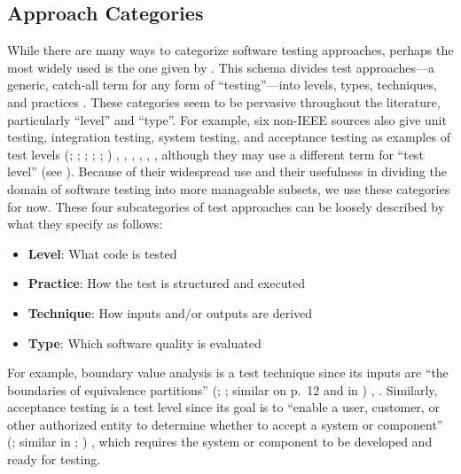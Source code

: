 \subsection{Approach Categories}
\label{categories-observ}

While there are many ways to categorize software testing approaches, perhaps
the most widely used is the one given by \ifnotpaper\else \citeauthor{IEEE2022}
\fi \citet{IEEE2022}. This schema divides test approaches---a generic, catch-all
term for any form of ``testing''---into levels, types, techniques, and practices
\citeyearpar[Fig.~2; see ]{IEEE2022}. These categories seem
to be pervasive throughout the literature, particularly ``level'' and ``type''.
\label{nonIEEE-sources}%
For example, six non-IEEE sources also give unit testing, integration testing,
system testing, and acceptance testing as examples of test levels \ifnotpaper
    (\citealp[pp.~5\=/6 to 5\=/7]{SWEBOK2024}; \citealpISTQB{};
    \citealp[pp.~807\==808]{Perry2006}; \citealp[pp.~443\==445]{PetersAndPedrycz2000};
    \citealp[p.~218]{KuļešovsEtAl2013};
    \citealp[pp.~9, 13]{Gerrard2000a})\else
    \cite[pp.~443\==445]{PetersAndPedrycz2000},
    \cite[pp.~5\=/6 to 5\=/7]{SWEBOK2024}, \cite{ISTQB},
    \cite[pp.~807\==808]{Perry2006}, \cite[pp.~9, 13]{Gerrard2000a},
    \cite[p.~218]{KuļešovsEtAl2013}\fi,
although they may use a different term for ``test
level'' (see ). Because of their widespread use and
their usefulness in dividing the domain of software testing into more
manageable subsets, we use these categories for now. These four subcategories
of test approaches can be loosely described by what they specify as
follows:
\begin{itemize}
    \item \textbf{Level}: What code is tested
    \item \textbf{Practice}: How the test is structured and executed
    \item \textbf{Technique}: How inputs and/or outputs are derived
    \item \textbf{Type}: Which software quality is evaluated
\end{itemize}
For example, boundary value analysis is a test technique since its inputs are
``the boundaries of equivalence partitions'' \ifnotpaper
    (\citealp[p.~2]{IEEE2022}; \citeyear[p.~1]{IEEE2021}; similar on p.~12 and
    in \citealpISTQB{})%
\else
    \cite[p.~2]{IEEE2022}, \cite[p.~1]{IEEE2021}%
\fi. Similarly, acceptance testing is a test level since its goal is to
``enable a user, customer, or other authorized entity to determine whether to
accept a system or component'' \ifnotpaper (\citealp[p.~5]{IEEE2017}; similar
    in \citeyear[p.~6]{IEEE2021}; \citealp[p.~344]{SakamotoEtAl2013})\else
    \cite[p.~5]{IEEE2017}\fi, which requires the system or component to be
developed and ready for testing.

